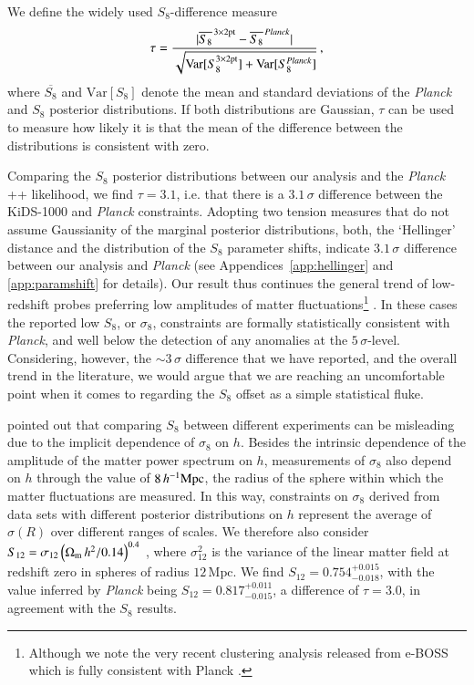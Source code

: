 We define the widely used $S_8$-difference measure
\begin{equation}
\label{eq: std_tension}
\tau = \frac{|\overline{S_{8}}^{\,\rm 3\times2pt}-\overline{S_{8}}^{\,\it Planck}|}{\sqrt{\mathrm{Var}[S_{8}^{\rm 3\times2pt}] + \mathrm{Var}[S_{8}^{\it Planck}]}} \,,
\end{equation}
where $\overline{S_{8}}$ and $\mathrm{Var}[S_{8}] $ denote the mean and standard deviations of the {\it Planck} and \tttp $S_8$ posterior distributions.  If both distributions are Gaussian, $\tau$ can be used to measure how likely it is that the mean of the difference between the distributions is consistent with zero.

Comparing the $S_{8}$ posterior distributions between our \tttp analysis and the {\it Planck} ++ likelihood, we find $\tau=3.1$, i.e. that there is a $3.1\,\sigma$ difference between the KiDS-1000 and {\it Planck} constraints. 
%  
Adopting two tension measures that do not assume Gaussianity of the marginal posterior distributions, both, the `Hellinger' distance and the distribution of the $S_{8}$ parameter shifts, indicate $3.1\,\sigma$ difference between our \tttp analysis and {\it Planck} (see Appendices~\ref{app:hellinger} and \ref{app:paramshift} for details).  
%
Our result thus continues the general trend of low-redshift probes preferring low amplitudes of matter fluctuations\footnote{Although we note the very recent clustering analysis released from e-BOSS which is fully consistent with Planck \citep{eBOSS/etal:2020}.} \citep{heymans/etal:2013, alam/etal:2017, abbott/etal:2018, hikage/etal:2019, bocquet/etal:2019, palanque-delabrouille/etal:2020, wright/etal:2020b,DESclusters/etal:2020}. 
In these cases the reported low $S_8$, or $\sigma_8$, constraints are formally statistically consistent with {\it Planck}, and well below the detection of any anomalies at the $5\,\sigma$-level. 
Considering, however, the $\sim\! 3\,\sigma$ difference that we have reported, and the overall trend in the literature, we would argue that we are reaching an uncomfortable point when it comes to regarding the $S_8$ offset as a simple statistical fluke.

\citet{Sanchez2020} pointed out that comparing $S_{8}$ between different experiments can be misleading due to the implicit dependence of $\sigma_{8}$ on $h$. 
Besides the intrinsic dependence of the amplitude of the matter power spectrum on $h$, measurements of $\sigma_{8}$ also depend on $h$ through the value of $8\,h^{-1}{\rm Mpc}$, the radius of the sphere within which the matter fluctuations are measured. 
In this way, constraints on $\sigma_8$ derived from data sets with different posterior distributions on $h$ represent the average of $\sigma(R)$ over different ranges of scales. 
%
We therefore also consider $S_{12} = \sigma_{12}\left(\Omega_{\rm m}\,h^2/0.14\right)^{0.4}$ \citep{Sanchez2020}, where $\sigma_{12}^{2}$ is the variance of the linear matter field at redshift zero in spheres of radius $12\,\mathrm{Mpc}$.
We find $S_{12} = 0.754^{+0.015}_{-0.018}$, with the value inferred by {\it Planck} being $S_{12} = 0.817_{-0.015}^{+0.011}
$, a difference of $\tau=3.0$, in agreement with the $S_8$ results. 

